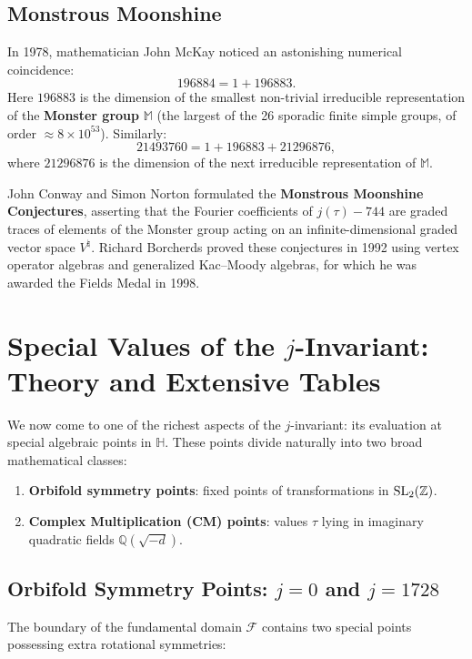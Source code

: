 \documentclass[a4paper]{article}
\begin{document}
\subsection{Monstrous Moonshine}
In 1978, mathematician John McKay noticed an astonishing numerical coincidence:
\begin{equation}
 196884 = 1 + 196883.
\end{equation}
Here $196883$ is the dimension of the smallest non-trivial irreducible representation of the \textbf{Monster group} $\mathbb{M}$ (the largest of the 26 sporadic finite simple groups, of order $\approx 8 \times 10^{53}$). Similarly:
\begin{equation}
 21493760 = 1 + 196883 + 21296876,
\end{equation}
where $21296876$ is the dimension of the next irreducible representation of $\mathbb{M}$. 

John Conway and Simon Norton formulated the \textbf{Monstrous Moonshine Conjectures}, asserting that the Fourier coefficients of $j(\tau) - 744$ are graded traces of elements of the Monster group acting on an infinite-dimensional graded vector space $V^\natural$. Richard Borcherds proved these conjectures in 1992 using vertex operator algebras and generalized Kac--Moody algebras, for which he was awarded the Fields Medal in 1998.

\section{Special Values of the \texorpdfstring{$j$}{j}-Invariant: Theory and Extensive Tables}
\label{sec:special_values}

We now come to one of the richest aspects of the $j$-invariant: its evaluation at special algebraic points in $\mathbb{H}$. These points divide naturally into two broad mathematical classes:
\begin{enumerate}
 \item \textbf{Orbifold symmetry points}: fixed points of transformations in $\mathrm{SL}_2(\mathbb{Z})$.
 \item \textbf{Complex Multiplication (CM) points}: values $\tau$ lying in imaginary quadratic fields $\mathbb{Q}(\sqrt{-d})$.
\end{enumerate}

\subsection{Orbifold Symmetry Points: \texorpdfstring{$j=0$}{j=0} and \texorpdfstring{$j=1728$}{j=1728}}
The boundary of the fundamental domain $\mathcal{F}$ contains two special points possessing extra rotational symmetries:
\end{document}
